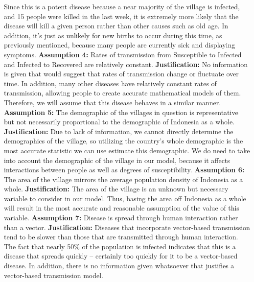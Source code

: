 \documentclass[11pt]{article}
\begin{document}
Since this is a potent disease because a near majority of the village is infected, and 15 people were killed in the last week, it is extremely more likely that the disease will kill a given person rather than other causes such as old age. In addition, it’s just as unlikely for new births to occur during this time, as previously mentioned, because many people are currently sick and displaying symptoms.
\newline
\newline
\textbf{Assumption 4:} Rates of transmission from Susceptible to Infected and Infected to Recovered are relatively constant.
\newline
\textbf{Justification:} No information is given that would suggest that rates of transmission change or fluctuate over time. In addition, many other diseases have relatively constant rates of transmission, allowing people to create accurate mathematical models of them. Therefore, we will assume that this disease behaves in a similar manner.
\newline
\newline
\textbf{Assumption 5:} The demographic of the villages in question is representative but not necessarily proportional to the demographic of Indonesia as a whole.
\newline
\textbf{Justification:} Due to lack of information, we cannot directly determine the demographics of the village, so utilizing the country’s whole demographic is the most accurate statistic we can use estimate this demographic. We do need to take into account the demographic of the village in our model, because it affects interactions between people as well as degrees of susceptibility.
\newline
\newline
\textbf{Assumption 6:} The area of the village mirrors the average population density of Indonesia as a whole.
\newline
\textbf{Justification:} The area of the village is an unknown but necessary variable to consider in our model. Thus, basing the area off Indonesia as a whole will result in the most accurate and reasonable assumption of the value of this variable.
\newline
\newline
\textbf{Assumption 7:} Disease is spread through human interaction rather than a vector.
\newline
\textbf{Justification:} Diseases that incorporate vector-based transmission tend to be slower than those that are transmitted through human interaction. The fact that nearly 50\% of the population is infected indicates that this is a disease that spreads quickly -- certainly too quickly for it to be a vector-based disease. In addition, there is no information given whatsoever that justifies a vector-based transmission model.
\end{document}
